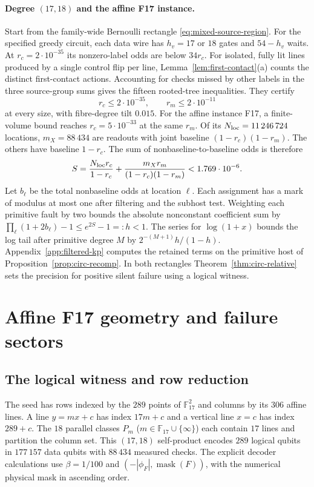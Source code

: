 \documentclass[10pt,twocolumn]{article}
\theoremstyle{definition}
\begin{document}
\paragraph{Degree $(17,18)$ and the affine F17 instance.}
Start from the family-wide Bernoulli rectangle
\eqref{eq:mixed-source-region}.
For the specified greedy circuit, each data wire has $h_v=17$ or $18$
gates and $54-h_v$ waits. At $r_c=2\cdot10^{-35}$ its nonzero-label
odds are below $34r_c$. For isolated, fully lit lines produced by
a single control flip per line, Lemma~\ref{lem:first-contact}(a)
counts the distinct first-contact actions.
Accounting for checks missed by other labels in the three source-group
sums gives the fifteen rooted-tree inequalities. They certify
\[
 r_c\le2\cdot10^{-35},\qquad r_m\le2\cdot10^{-11}
\]
at every size, with fibre-degree tilt $0.015$.
For the affine instance F17, a finite-volume bound reaches
$r_c=5\cdot10^{-33}$ at the same $r_m$. Of its
$N_{\rm loc}=11\,246\,724$ locations, $m_X=88\,434$ are readouts
with joint baseline $(1-r_c)(1-r_m)$. The others have baseline
$1-r_c$. The sum of nonbaseline-to-baseline odds is therefore
\[
 S=\frac{N_{\rm loc}r_c}{1-r_c}
   +\frac{m_X r_m}{(1-r_c)(1-r_m)}<1.769\cdot10^{-6}.
\]
Let $b_\ell$ be the total nonbaseline odds at location $\ell$. Each
assignment has a mark of modulus at most one after filtering and the
subhost test. Weighting each primitive fault by two bounds the absolute
nonconstant coefficient sum by $\prod_\ell(1+2b_\ell)-1\le e^{2S}-1=:h<1$.
The series for $\log(1+x)$ bounds the log tail after primitive degree
$M$ by $2^{-(M+1)}h/(1-h)$. Appendix~\ref{app:filtered-kp} computes
the retained terms on the primitive host of Proposition~\ref{prop:circ-recomp}.
In both rectangles Theorem~\ref{thm:circ-relative} sets the precision
for positive silent failure using a logical witness.

\section{Affine F17 geometry and failure sectors}\label{app:affine-detail}
\subsection{The logical witness and row reduction}\label{app:f17algebra}
The seed has rows indexed by the $289$ points of $\mathbb F_{17}^2$
and columns by its $306$ affine lines. A line $y=mx+c$ has index
$17m+c$ and a vertical line $x=c$ has index $289+c$. The $18$ parallel
classes $P_m$ ($m\in\mathbb F_{17}\cup\{\infty\}$) each contain $17$
lines and partition the column set. This $(17,18)$ self-product encodes
$289$ logical qubits in $177\,157$ data qubits with $88\,434$ measured checks. The explicit decoder calculations
use $\beta=1/100$ and $(-|\phi_F|,\operatorname{mask}(F))$, with the
numerical physical mask in ascending order.
\end{document}
